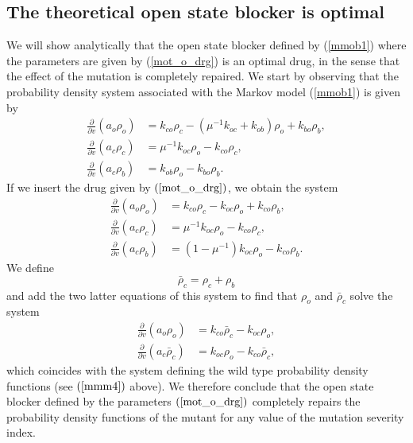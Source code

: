\subsection{The theoretical open state blocker is optimal}
We will show analytically that the open state blocker defined by (\ref{mmob1}) where the parameters are given by
(\ref{mot_o_drg}) is an optimal drug, in the sense that the effect of the mutation is completely repaired.
We start by observing that the probability density system associated with the Markov model  (\ref{mmob1}) is given by
\begin{align}
\frac{\partial}{\partial v}\left(  a_{o}\rho_{o}\right)   &  =k_{co}\rho
_{c}-(\mu^{-1}k_{oc}+k_{ob})\rho_{o}+k_{bo}\rho_{b},\nonumber\\
\frac{\partial}{\partial v}\left(  a_{c}\rho_{c}\right)   &  =\mu^{-1}%
k_{oc}\rho_{o}-k_{co}\rho_{c},\label{mm_dr_3}\\
\frac{\partial}{\partial v}\left(  a_{c}\rho_{b}\right)   &  =k_{ob}\rho
_{o}-k_{bo}\rho_{b}.\nonumber
\end{align}
If we insert the drug given by $\left(  \ref{mot_o_drg}\right)  $, we obtain the
system
\begin{align}
\frac{\partial}{\partial v}\left(  a_{o}\rho_{o}\right)   &  =k_{co}\rho
_{c}-k_{oc}\rho_{o}+k_{co}\rho_{b},\nonumber\\
\frac{\partial}{\partial v}\left(  a_{c}\rho_{c}\right)   &  =\mu^{-1}%
k_{oc}\rho_{o}-k_{co}\rho_{c},\label{mm_dr_o2}\\
\frac{\partial}{\partial v}\left(  a_{c}\rho_{b}\right)   &  =\left(
1-\mu^{-1}\right)  k_{oc}\rho_{o}-k_{co}\rho_{b}.\nonumber
\end{align}
We define%
\[
\bar{\rho}_{c}=\rho_{c}+\rho_{b}%
\]
and add the two latter equations of this system to find that $\rho_{o}$ and 
$\bar{\rho}_{c}$ solve the system%
\begin{align}
\frac{\partial}{\partial v}\left(  a_{o}\rho_{o}\right)   &  =k_{co}\bar{\rho
}_{c}-k_{oc}\rho_{o},\\
\frac{\partial}{\partial v}\left(  a_{c}\bar{\rho}_{c}\right)   &  =k_{oc}%
\rho_{o}-k_{co}\bar{\rho}_{c},\nonumber
\end{align}
which coincides with the system defining the wild type probability density
functions (see $\left(  \ref{mmm4}\right)  $ above). We therefore conclude that
the open state blocker defined by the parameters 
$\left(  \ref{mot_o_drg}\right)  $
completely repairs the probability density functions of the mutant for any
value of the mutation severity index.

